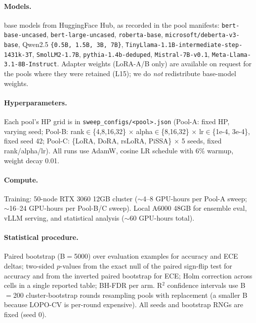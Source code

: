 \documentclass[11pt]{article}
\begin{document}
\paragraph{Models.} { base models from HuggingFace Hub, as recorded in the pool manifests: \texttt{bert-base-uncased}, \texttt{bert-large-uncased}, \texttt{roberta-base}, \texttt{microsoft/\allowbreak deberta-v3-base}, Qwen2.5 \texttt{\{0.5B, 1.5B, 3B, 7B\}}, \texttt{TinyLlama-1.1B-intermediate-step-1431k-3T}, \texttt{SmolLM2-1.7B}, \texttt{pythia-1.4b-deduped}, \texttt{Mistral-7B-v0.1}, \texttt{Meta-Llama-3.1-8B-Instruct}. Adapter weights (LoRA-A/B only) are available on request for the pools where they were retained (L15); we do \emph{not} redistribute base-model weights.\par}
\paragraph{Hyperparameters.} Each pool's HP grid is in \texttt{sweep\_\allowbreak configs/\allowbreak <pool>.\allowbreak json} (Pool-A: fixed HP, varying seed; Pool-B: rank$\in$\{4,8,16,32\} $\times$ alpha$\in$\{8,16,32\} $\times$ lr$\in$\{1e-4, 3e-4\}, fixed seed 42; Pool-C: \{LoRA, DoRA, rsLoRA, PiSSA\} $\times$ 5 seeds, fixed rank/alpha/lr). All runs use AdamW, cosine LR schedule with 6\% warmup, weight decay 0.01.
\paragraph{Compute.} Training: 50-node RTX 3060 12GB cluster ($\sim$4--8 GPU-hours per Pool-A sweep; $\sim$16--24 GPU-hours per Pool-B/C sweep). Local A6000 48GB for ensemble eval, vLLM serving, and statistical analysis ($\sim$60 GPU-hours total).
\paragraph{Statistical procedure.} Paired bootstrap (B$=$5000) over evaluation examples for accuracy and ECE deltas; two-sided $p$-values from the exact null of the paired sign-flip test for accuracy and from the inverted paired bootstrap for ECE; Holm correction across cells in a single reported table; BH-FDR per arm. R$^2$ confidence intervals use B$=$200 cluster-bootstrap rounds resampling pools with replacement (a smaller B because LOPO-CV is per-round expensive). All seeds and bootstrap RNGs are fixed (seed 0).
\end{document}
